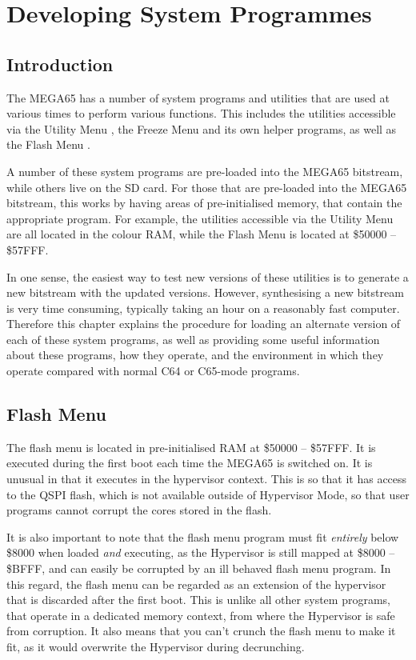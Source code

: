 \chapter{Developing System Programmes}

\section{Introduction}

The MEGA65 has a number of system programs and utilities that are used at various times to perform various functions.
This includes the utilities accessible via the Utility Menu , the Freeze Menu  and
its own helper programs, as well as the Flash Menu .

A number of these system programs are pre-loaded into the MEGA65 bitstream, while others live on the SD card.
For those that are pre-loaded into the MEGA65 bitstream, this works by having areas of pre-initialised memory, that
contain the appropriate program.  For example, the utilities accessible via the Utility Menu are all located in
the colour RAM, while the Flash Menu is located at \$50000 -- \$57FFF.

In one sense, the easiest way to test new versions of these utilities is to generate a new bitstream with the updated versions.
However, synthesising a new bitstream is very time consuming, typically taking an hour on a reasonably fast computer.
Therefore this chapter explains the procedure for loading an alternate version of each of these system programs, as well as
providing some useful information about these programs, how they operate, and the environment in which they operate compared
with normal C64 or C65-mode programs.

\section{Flash Menu}

The flash menu is located in pre-initialised RAM at \$50000 -- \$57FFF.  It is executed during the first boot each time the
MEGA65 is switched on.  It is unusual in that it executes in the hypervisor context. This is so that it has access to
the QSPI
flash, which is not available outside of Hypervisor Mode, so that user programs cannot corrupt the cores stored in the flash.

It is also important to note that the flash menu program must fit {\em entirely} below \$8000 when loaded {\em and} executing, as the Hypervisor is still mapped at \$8000 -- \$BFFF, and can easily be corrupted by an ill behaved flash menu program.  In this regard, the flash menu
can be regarded as an extension of the hypervisor that is discarded after the first boot.
This is unlike all other system programs, that operate in a dedicated memory context, from where the Hypervisor is safe from corruption. It also means that you can't crunch the flash menu to make it fit, as it would overwrite the Hypervisor during decrunching.

